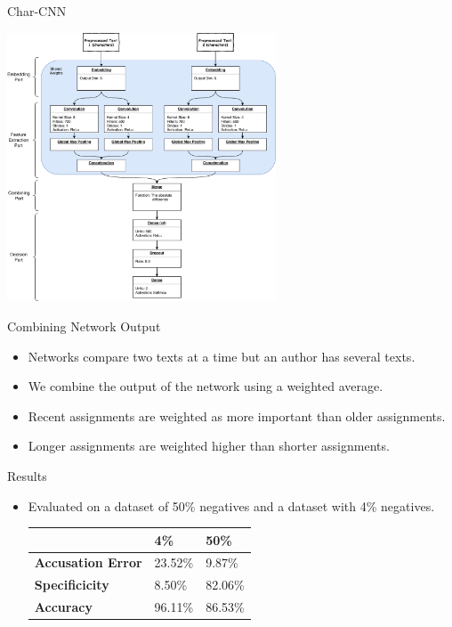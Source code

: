 \documentclass[10pt]{beamer}
\begin{document}
\begin{frame}[fragile]{Char-CNN}
    \begin{center}
        \includegraphics[width=0.6\textwidth]{../../macom/summary/pictures/model}
    \end{center}
\end{frame}

\begin{frame}[fragile]{Combining Network Output}
    \begin{itemize}
        \item Networks compare two texts at a time but an author has several
            texts.
        \item We combine the output of the network using a weighted average.
        \item Recent assignments are weighted as more important than older
            assignments.
        \item Longer assignments are weighted higher than shorter assignments.
    \end{itemize}
\end{frame}

\begin{frame}[fragile]{Results}
    \begin{itemize}
        \item Evaluated on a dataset of 50\% negatives and a dataset with 4\%
            negatives.

            \begin{center}
                \begin{tabular}{l|ll}
                                              & \textbf{4\%} & \textbf{50\%} \\
                    \hline
                    \textbf{Accusation Error} & 23.52\%      & 9.87\%        \\
                    \textbf{Specificicity}    & 8.50\%       & 82.06\%       \\
                    \textbf{Accuracy}         & 96.11\%      & 86.53\%       \\
                \end{tabular}
            \end{center}
    \end{itemize}
\end{frame}
\end{document}
